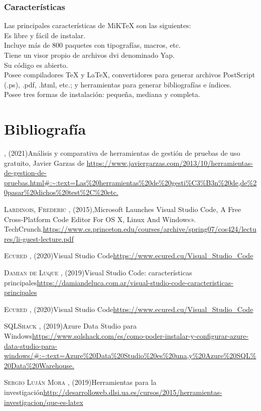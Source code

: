 \documentclass[twocolumn]{article}
\begin{document}
\subsubsection{Características}
Las principales características de MiKTeX son las siguientes:\\

Es libre y fácil de instalar.\\
Incluye más de 800 paquetes con tipografías, macros, etc.\\
Tiene un visor propio de archivos dvi denominado Yap.\\
Su código es abierto.\\
Posee compiladores TeX y LaTeX, convertidores para generar archivos PostScript (.ps), .pdf, .html, etc.; y herramientas para generar bibliografías e índices.\\
Posee tres formas de instalación: pequeña, mediana y completa.\\


\section{Bibliografía}

\begin{thebibliography}{X}
  
  
   \textsc{} ,
  \textit{}(2021)Análisis y comparativa de herramientas de gestión de pruebas de uso gratuito, Javier Garzas de \url{https://www.javiergarzas.com/2013/10/herramientas-de-gestion-de-pruebas.html#:~:text=Las%20herramientas%20de%20gesti%C3%B3n%20de,de%20pasar%20dichos%20test%2C%20etc.}
  
  
   \textsc{Lardinois, Frederic } ,
  \textit{}(2015),Microsoft Launches Visual Studio Code, A Free Cross-Platform Code Editor For OS X, Linux And Windows». TechCrunch.\url{https://www.cs.princeton.edu/courses/archive/spring07/cos424/lectures/li-guest-lecture.pdf}


   \textsc{Ecured} ,
  \textit{}(2020)Visual Studio Code\url{https://www.ecured.cu/Visual_Studio_Code}
  
   \textsc{Damian de Luque} ,
  \textit{}(2019)Visual Studio Code: características principales\url{https://damiandeluca.com.ar/visual-studio-code-caracteristicas-principales}

   \textsc{Ecured} ,
  \textit{}(2020)Visual Studio Code\url{https://www.ecured.cu/Visual_Studio_Code}

   \textsc{SQLShack} ,
    \textit{}(2019)Azure Data Studio para Windows\url{https://www.sqlshack.com/es/como-poder-instalar-y-configurar-azure-data-studio-para-windows/#:~:text=Azure%20Data%20Studio%20es%20una,y%20Azure%20SQL%20Data%20Warehouse.}
  
     \textsc{Sergio Luján Mora} ,
    \textit{}(2019)Herramientas para la investigación\url{http://desarrolloweb.dlsi.ua.es/cursos/2015/herramientas-investigacion/que-es-latex}


\end{thebibliography}
\end{document}

